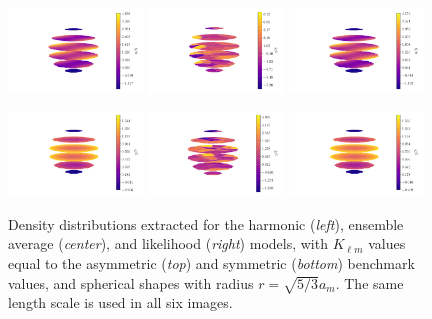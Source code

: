 \documentclass{aastex631}
\begin{document}
\begin{figure}
  \centering
  \includegraphics[width=0.32\textwidth]{harmonic-asym-sph.pdf}
  \includegraphics[width=0.32\textwidth]{ensemble-asym-sph.pdf}
  \includegraphics[width=0.32\textwidth]{likelihood-asym-sph.pdf}

  \includegraphics[width=0.32\textwidth]{harmonic-sym-sph.pdf}
  \includegraphics[width=0.32\textwidth]{ensemble-sym-sph.pdf}
  \includegraphics[width=0.32\textwidth]{likelihood-sym-sph.pdf}
  \caption{Density distributions extracted for the harmonic (\textit{left}), ensemble average (\textit{center}), and likelihood (\textit{right}) models, with $K_{\ell m}$ values equal to the asymmetric (\textit{top}) and symmetric (\textit{bottom}) benchmark values, and spherical shapes with radius $r=\sqrt{5/3} a_m$. The same length scale is used in all six images.}
  \label{fig:fix-sphere-model-test}
\end{figure}
\end{document}
